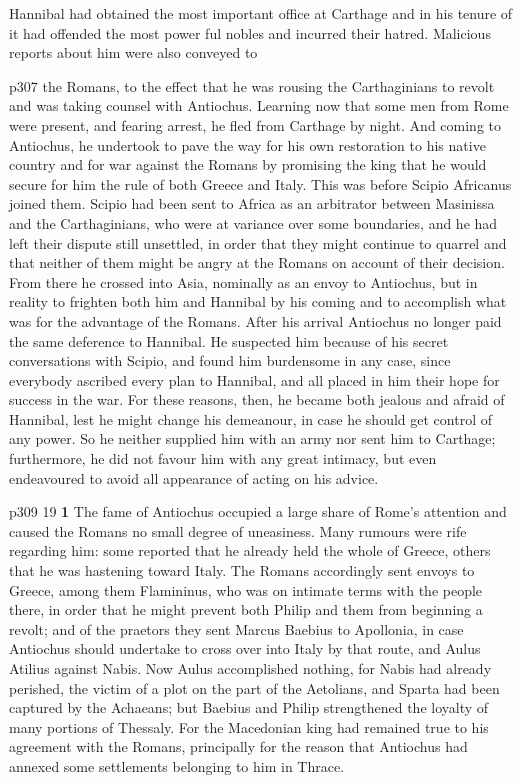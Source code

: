Hannibal had obtained the most important office at Carthage and in his tenure of it had offended the most power ­ful nobles and incurred their hatred. Malicious reports about him were also conveyed to

p307 the Romans, to the effect that he was rousing the Carthaginians to revolt and was taking counsel with Antiochus. Learning now that some men from Rome were present, and fearing arrest, he fled from Carthage by night. And coming to Antiochus, he undertook to pave the way for his own restoration to his native country and for war against the Romans by promising the king that he would secure for him the rule of both Greece and Italy. This was before Scipio Africanus joined them. Scipio had been sent to Africa as an arbitrator between Masinissa and the Carthaginians, who were at variance over some boundaries, and he had left their dispute still unsettled, in order that they might continue to quarrel and that neither of them might be angry at the Romans on account of their decision. From there he crossed into Asia, nominally as an envoy to Antiochus, but in reality to frighten both him and Hannibal by his coming and to accomplish what was for the advantage of the Romans. After his arrival Antiochus no longer paid the same deference to Hannibal. He suspected him because of his secret conversations with Scipio, and found him burdensome in any case, since everybody ascribed every plan to Hannibal, and all placed in him their hope for success in the war. For these reasons, then, he became both jealous and afraid of Hannibal, lest he might change his demeanour, in case he should get control of any power. So he neither supplied him with an army nor sent him to Carthage; furthermore, he did not favour him with any great intimacy, but even endeavoured to avoid all appearance of acting on his advice.

p309
19
\textbf{1} The fame of Antiochus occupied a large share of Rome's attention and caused the Romans no small degree of uneasiness. Many rumours were rife regarding him: some reported that he already held the whole of Greece, others that he was hastening toward Italy. The Romans accordingly sent envoys to Greece, among them Flamininus, who was on intimate terms with the people there, in order that he might prevent both Philip and them from beginning a revolt; and of the praetors they sent Marcus Baebius to Apollonia, in case Antiochus should undertake to cross over into Italy by that route, and Aulus Atilius against Nabis. Now Aulus accomplished nothing, for Nabis had already perished, the victim of a plot on the part of the Aetolians, and Sparta had been captured by the Achaeans; but Baebius and Philip strengthened the loyalty of many portions of Thessaly. For the Macedonian king had remained true to his agreement with the Romans, principally for the reason that Antiochus had annexed some settlements belonging to him in Thrace.


